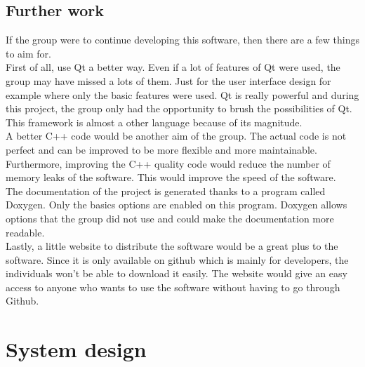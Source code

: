 \chapter{Further work}
If the group were to continue developing this software, then there are a few things to aim for.\\
First of all, use Qt a better way. Even if a lot of features of Qt were used, the group may have missed a lots of them. Just for the user interface design for example where only the basic features were used. Qt is really powerful and during this project, the group only had the opportunity to brush the possibilities of Qt. This framework is almost a other language because of its magnitude.\\
A better C++ code would be another aim of the group. The actual code is not perfect and can be improved to be more flexible and more maintainable. Furthermore, improving the C++ quality code would reduce the number of memory leaks of the software. This would improve the speed of the software.\\
The documentation of the project is generated thanks to a program called Doxygen. Only the basics options are enabled on this program. Doxygen allows options that the group did not use and could make the documentation more readable.\\
Lastly, a little website to distribute the software would be a great plus to the software. Since it is only available on github which is mainly for developers, the individuals won't be able to download it easily. The website would give an easy access to anyone who wants to use the software without having to go through Github.\\%
\part{System design}

